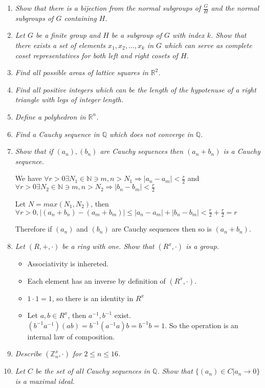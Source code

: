 \documentclass[11pt]{article}
\begin{document}
\begin{enumerate}
\item \emph{Show that there is a bijection from the normal subgroups of $\frac{G}{H}$ and the normal subgroups of $G$ containing $H$.}
\item \emph{Let $G$ be a finite group and $H$ be a subgroup of $G$ with index $k$.  Show that there exists a set of elements $x_1,x_2,\ldots,x_k$ in $G$ which can serve as complete coset representatives for both left and right cosets of $H$.}
\item \emph{Find all possible areas of lattice squares in $\mathbb{R}^2$.}
\item \emph{Find all positive integers which can be the length of the hypotenuse of a right triangle with legs of integer length.}
\item \emph{Define a polyhedron in $\mathbb{R}^n$.}
\item \emph{Find a Cauchy sequence in $\mathbb{Q}$ which does not converge in $\mathbb{Q}$.}
\item \emph{Show that if $(a_n),(b_n)$ are Cauchy sequences then $(a_n + b_n)$ is a Cauchy sequence.}

We have 
$\forall r>0 \exists N_1 \in \mathbb{N} \ni m,n>N_1 \Rightarrow |a_n - a_m|<\frac{r}{2}$ and 
$\forall r>0 \exists N_2 \in \mathbb{N} \ni m,n>N_2 \Rightarrow |b_n - b_m|<\frac{r}{2}$

Let $N=max(N_1,N_2)$, then  $\forall r>0,|(a_n + b_n) - (a_m + b_m)| \leq |a_n - a_m| + |b_n - b_m| < \frac{r}{2} + \frac{r}{2} = r$

Therefore if $(a_n)$ and $(b_n)$ are Cauchy sequences then so is $(a_n + b_n)$.
\item \emph{Let $(R,+,\cdot)$ be a ring with one. Show that $(R^x,\cdot)$ is a group.}
\begin{itemize}
\item Associativity is inhereted.
\item Each element has an inverse by definition of $(R^x,\cdot)$.
\item $1\cdot1 = 1$, so there is an identity in $R^x$
\item Let $a,b \in R^x$, then $a^{-1},b^{-1}$ exist.  $(b^{-1}a^{-1})(ab) = b^{-1}(a^{-1}a)b = b^{-1}b = 1$.  So the operation is an internal law of composition.
\end{itemize}

\item \emph{Describe $(\mathbb{Z}^x_n,\cdot)$ for $2 \leq n \leq 16$.}

\item \emph{Let $C$ be the set of all Cauchy sequences in $\mathbb{Q}$. Show that $\{(a_n) \in C | a_n \rightarrow 0\}$ is a maximal ideal.}
\end{enumerate}
\end{document}
